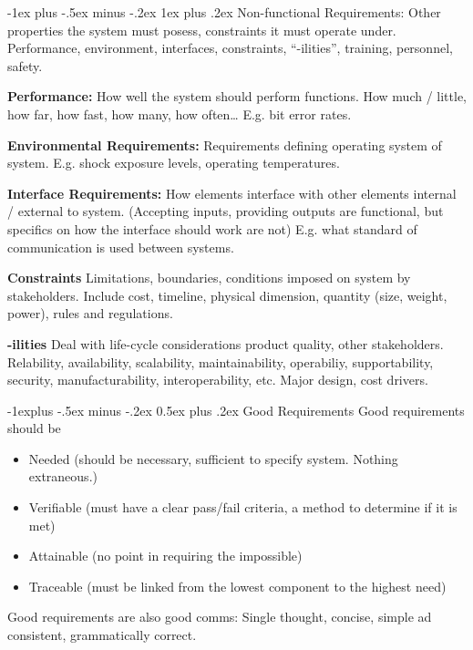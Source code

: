 \documentclass[letterpaper, 8pt]{extarticle}
\makeatletter
\renewcommand{\subsection}{\@startsection{subsection}{2}{0mm}%
                                {-1explus -.5ex minus -.2ex}%
                                {0.5ex plus .2ex}%
                                {\normalfont\small\bfseries}}
\renewcommand{\subsubsection}{\@startsection{subsubsection}{3}{0mm}%
                                {-1ex plus -.5ex minus -.2ex}%
                                {1ex plus .2ex}%
                                {\normalfont\tiny\bfseries}}
\makeatother
\begin{document}
\begin{multicols*}{4}
\subsubsection{Non-functional Requirements:}
Other properties the system must posess, constraints it must operate under.
Performance, environment, interfaces, constraints, ``-ilities'', training, personnel, safety.

\textbf{Performance:}
How well the system should perform functions.
How much / little, how far, how fast, how many, how often\dots
E.g. bit error rates.

\textbf{Environmental Requirements:}
Requirements defining operating system of system. E.g. shock exposure levels, operating temperatures.

\textbf{Interface Requirements:}
How elements interface with other elements internal / external to system.
(Accepting inputs, providing outputs are functional, but specifics on how the interface should work are not)
E.g. what standard of communication is used between systems.

\textbf{Constraints}
Limitations, boundaries, conditions imposed on system by stakeholders.
Include cost, timeline, physical dimension, quantity (size, weight, power), rules and regulations.

\textbf{-ilities}
Deal with life-cycle considerations product quality, other stakeholders.
Relability, availability, scalability, maintainability, operabiliy, supportability, security, manufacturability, interoperability, etc.
Major design, cost drivers.

\subsection{Good Requirements}
Good requirements should be
\begin{itemize}
    \item Needed (should be necessary, sufficient to specify system. Nothing extraneous.)
    \item Verifiable (must have a clear pass/fail criteria, a method to determine if it is met)
    \item Attainable (no point in requiring the impossible)
    \item Traceable (must be linked from the lowest component to the highest need)
\end{itemize}
Good requirements are also good comms:
Single thought, concise, simple ad consistent, grammatically correct.


\end{multicols*}
\end{document}

